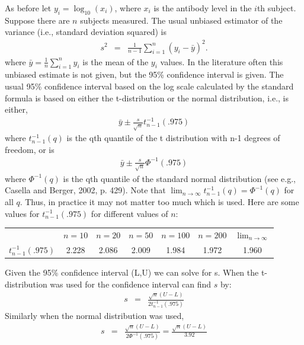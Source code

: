 \documentclass{article}[12pt]
\begin{document}
As before let $y_i =\log_{10}(x_i)$, where $x_i$ is the antibody 
level in the $i$th subject. Suppose there are $n$ subjects measured.  
The usual unbiased estimator of the variance (i.e., standard 
deviation squared) is
\begin{eqnarray*}
s^2 & = & \frac{1}{n-1} \sum_{i=1}^{n} (y_i - \bar{y})^2.
\end{eqnarray*}
where $\bar{y}=\frac{1}{n} \sum_{i=1}^{n} y_i$ is the mean of the 
$y_i$ values.  In the literature often this unbiased estimate is not 
given, but the 95\% confidence interval is given.  The usual 95\%
confidence interval based on the log scale calculated by the
standard formula is based on either the t-distribution or the normal distribution, i.e., is either,
\begin{eqnarray*}
\bar{y} \pm \frac{s}{\sqrt{n}} t^{-1}_{n-1}(.975)
\end{eqnarray*}
where $t^{-1}_{n-1}(q)$
is the qth quantile of the t distribution with n-1 degrees of
freedom, or is 
\begin{eqnarray*}
\bar{y} \pm \frac{s}{\sqrt{n}} \Phi^{-1}(.975)
\end{eqnarray*}
where $\Phi^{-1}(q)$
is the qth quantile of the standard normal distribution (see e.g., Casella and Berger, 2002, p. 429).
Note that  $\lim_{n \rightarrow \infty}   t^{-1}_{n-1}(q) = \Phi^{-1}(q)$ for all $q$. Thus, in practice it may not matter too much which is used. 
Here are some values for $t^{-1}_{n-1}(.975)$ for different values of $n$:

\begin{tabular}{ccccccc}
                      & $n=10$ & $n=20$ & $n=50$ & $n=100$ & $n=200$ & $\lim_{n \rightarrow \infty}$ \\
$t^{-1}_{n-1}(.975)$  &  2.228 & 2.086 & 2.009 & 1.984 & 1.972 & 1.960 \\
\end{tabular}
 
Given
the 95\% confidence interval (L,U)  we can solve for s. When the t-distribution was used for the confidence interval can find $s$ by:
\begin{eqnarray}
s & = & \frac{ \sqrt{n} \left( U-L \right) }{ 2 t^{-1}_{n-1}(.975)
} \label{eq:sbyt}
\end{eqnarray}
Similarly when the normal distribution was used, 
\begin{eqnarray}
s & = & \frac{ \sqrt{n} \left( U-L \right) }{ 2 \Phi^{-1}(.975)
} = \frac{ \sqrt{n} \left( U-L \right) }{ 3.92}  \label{eq:sbyz}
\end{eqnarray}
\end{document}
